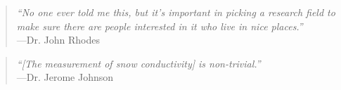 \vspace{2in}

\begin{quotation}
  {\it ``No one ever told me this, but it's important in picking a research field to make sure there are people interested in it who live in nice places.''} \\
  \hspace*{1in}---Dr. John Rhodes
\end{quotation}

\vspace{1in}

\begin{quotation}
  {\it ``[The measurement of snow conductivity] is non-trivial.''} \\ 
  \hspace*{1in}---Dr. Jerome Johnson
\end{quotation}
